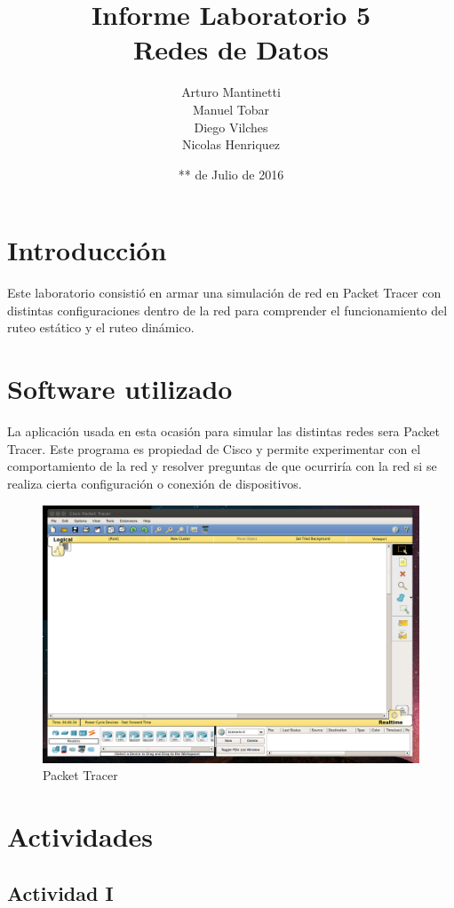 ﻿\documentclass[spanish]{udpreport}
\title{Informe Laboratorio 5 \\ Redes de Datos}
\author{Arturo Mantinetti \\ Manuel Tobar \\ Diego Vilches \\ Nicolas Henriquez}
\date{** de Julio de 2016}
\begin{document}
\maketitle

\tableofcontents

\chapter{Introducción}

Este laboratorio consistió en armar una simulación de red en Packet Tracer con distintas configuraciones dentro de la red para comprender el funcionamiento del ruteo estático y el ruteo dinámico.

\chapter{Software utilizado}
La aplicación usada en esta ocasión para simular las distintas redes sera Packet Tracer. Este programa es propiedad de Cisco y permite experimentar con el comportamiento de la red y resolver preguntas de que ocurriría con la red si se realiza cierta configuración o conexión de dispositivos.

\begin{figure}[H]
	\centering
	\includegraphics[scale=.25]{imagenes/A0e.png}
	\caption{Packet Tracer}
	\label{fig:Figura 1.1}
\end{figure}


\chapter{Actividades}

\section{Actividad I}
\end{document}
